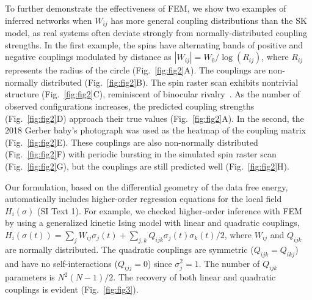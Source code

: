 \documentclass[prx,twocolumn,twoside,showpacs,superscriptaddress]{revtex4-1}
\begin{document}
To further demonstrate the effectiveness of FEM, we show two examples of inferred networks when $W_{ij}$ has more general coupling distributions than the SK model, as real systems often deviate strongly from normally-distributed coupling strengths.
In the first example, the spins have alternating bands of positive and negative couplings modulated by distance as $|W_{ij}| = W_{0}/\log(R_{ij})$, where $R_{ij}$ represents the radius of the circle (Fig.~\ref{fig:fig2}A). The couplings are non-normally distributed (Fig.~\ref{fig:fig2}B). The spin raster scan exhibits nontrivial structure (Fig.~\ref{fig:fig2}C), reminiscent of binocular rivalry~\cite{Moreno-Bote:2007a}. 
As the number of observed configurations increases, the predicted coupling strengths (Fig.~\ref{fig:fig2}D) approach their true values (Fig.~\ref{fig:fig2}A).
In the second, the 2018 Gerber baby's photograph was used as the heatmap of the coupling matrix (Fig.~\ref{fig:fig2}E). These couplings are also non-normally distributed (Fig.~\ref{fig:fig2}F) with periodic bursting in the simulated spin raster scan (Fig.~\ref{fig:fig2}G), but the couplings are still predicted well (Fig.~\ref{fig:fig2}H).


Our formulation, based on the differential geometry of the data free energy, automatically includes higher-order regression equations for the local field $H_i (\sigma)$ (SI Text 1).
For example, we checked higher-order inference with FEM by using a generalized kinetic Ising model with linear and quadratic couplings, $H_i(\sigma(t))=\sum_{j} W_{ij}\sigma_{j}(t) + \sum_{j,k} Q_{ijk} \sigma_j(t)\sigma_k(t)/2$, where $W_{ij}$ and $Q_{ijk}$ are normally distributed. The quadratic couplings are symmetric ($Q_{ijk} = Q_{ikj}$) and have no self-interactions ($Q_{ijj}=0$) since $\sigma_j^2 = 1.$ The number of $Q_{ijk}$ parameters is $N^2(N-1)/2.$ 
The recovery of both linear and quadratic couplings is evident (Fig.~\ref{fig:fig3}).
\end{document}
